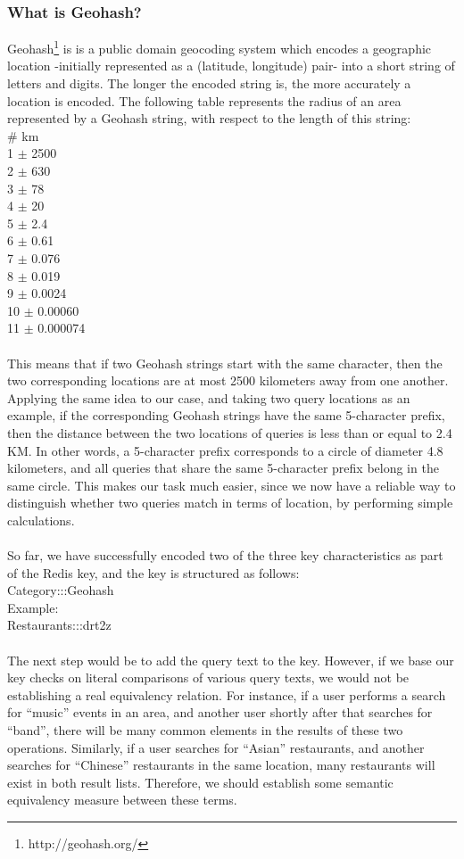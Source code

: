 \subsubsection{What is Geohash?}
Geohash\footnote{http://geohash.org/} is is a public domain geocoding system which encodes a geographic location -initially represented as a (latitude, longitude) pair- into a short string of letters and digits. The longer the encoded string is, the more accurately a location is encoded. The following table represents the radius of an area represented by a Geohash string, with respect to the length of this string:\\
\#  \hspace{5pt} km\\      
1   $\pm$ 2500\\
2   $\pm$ 630\\
3   $\pm$ 78\\
4   $\pm$ 20\\
5   $\pm$ 2.4\\
6   $\pm$ 0.61\\
7   $\pm$ 0.076\\
8   $\pm$ 0.019\\
9   $\pm$ 0.0024\\
10  $\pm$ 0.00060\\
11  $\pm$ 0.000074\\
\\
This means that if two Geohash strings start with the same character, then the two corresponding locations are at most 2500 kilometers away from one another. Applying the same idea to our case, and taking two query locations as an example, if the corresponding Geohash strings have the same 5-character prefix, then the distance between the two locations of queries is less than or equal to 2.4 KM. In other words, a 5-character prefix corresponds to a circle of diameter 4.8 kilometers, and all queries that share the same 5-character prefix belong in the same circle. This makes our task much easier, since we now have a reliable way to distinguish whether two queries match in terms of location, by performing simple calculations.\\\\
So far, we have successfully encoded two of the three key characteristics as part of the Redis key, and the key is structured as follows:\\
Category:::Geohash\\
Example:\\
Restaurants:::drt2z\\\\
The next step would be to add the query text to the key. However, if we base our key checks on literal comparisons of various query texts, we would not be establishing a real equivalency relation. For instance, if a user performs a search for ``music'' events in an area, and another user shortly after that searches for ``band'', there will be many common elements in the results of these two operations. Similarly, if a user searches for ``Asian'' restaurants, and another searches for ``Chinese'' restaurants in the same location, many restaurants will exist in both result lists. Therefore, we should establish some semantic equivalency measure between these terms.
\pagebreak
